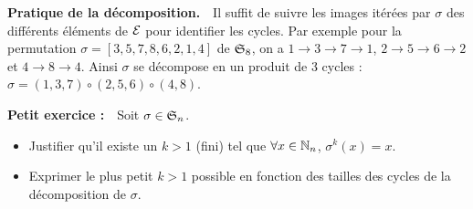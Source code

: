 \documentclass[11pt, a4paper]{article}
\begin{document}

\iffalse
\textbf{Une preuve courte via les actions de groupe (pour les
  initiés).}~~Si $\sigma$ est une permutation sur $\E$, le sous-groupe engendré
par $\sigma$ agit sur $\E$. Les orbites pour cette action de groupe
forment une partition de $\E$. L'action de $\sigma$ sur chacune des
orbites est celle d'un cycle.
\fi

\textbf{Pratique de la décomposition.}~~Il suffit de suivre les images
itérées par $\sigma$ des différents éléments de $\E$ pour identifier
les cycles. Par exemple pour la permutation $\sigma=[3,5,7,8,6,2,1,4]$ de
$\mathfrak{S}_8$, on a $1\rightarrow3\rightarrow7\rightarrow1$,
$2\rightarrow5\rightarrow6\rightarrow2$ et $4\rightarrow8\rightarrow4$. Ainsi $\sigma$ se décompose en un produit
de 3 cycles : $\sigma=(1,3,7)\circ(2,5,6)\circ(4,8)$.

\vspace{0.2cm}


\vspace{0.2cm}

\textbf{Petit exercice :}~~Soit $\sigma\in\mathfrak{S}_n$.
\begin{itemize}
\item[\polygona] Justifier qu'il existe un $k>1$ (fini) tel que
  $\forall x\in\mathbb{N}_n$, $\sigma^k(x)=x$.
\item Exprimer le plus petit $k>1$ possible en fonction des tailles
  des cycles de la décomposition de $\sigma$.
\end{itemize}

\vspace{0.4cm}


\label{lastpage}
\end{document}
